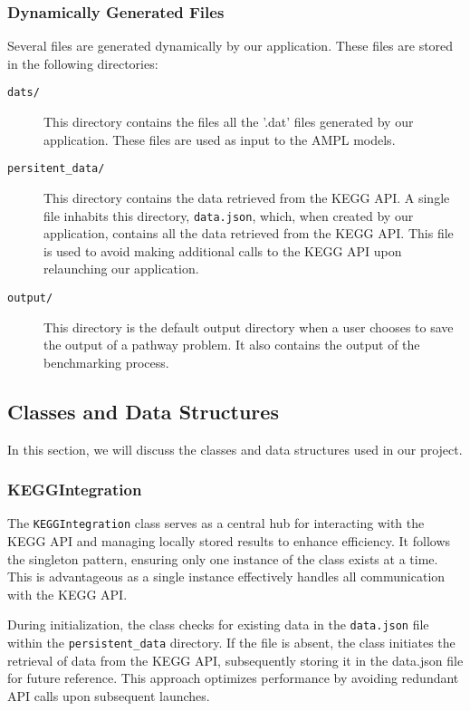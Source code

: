 \subsubsection{Dynamically Generated Files}

Several files are generated dynamically by our application. These files are stored in the following directories:

\begin{description}
    \item[\texttt{dats/}] This directory contains the files all the '.dat' files generated by our application. These files are used as input to the AMPL models.
    \item[\texttt{persitent\_data/}] This directory contains the data retrieved from the KEGG API. A single file inhabits this directory, \texttt{data.json}, which, when created by our application, contains all the data retrieved from the KEGG API. This file is used to avoid making additional calls to the KEGG API upon relaunching our application.
    \item[\texttt{output/}] This directory is the default output directory when a user chooses to save the output of a pathway problem. It also contains the output of the benchmarking process.
\end{description}

\subsection{Classes and Data Structures} \label{sec:classes_data_structures}

In this section, we will discuss the classes and data structures used in our project.

\subsubsection{KEGGIntegration}

The \texttt{KEGGIntegration} class serves as a central hub for interacting with the KEGG API and managing locally stored results to enhance efficiency. It follows the singleton pattern, ensuring only one instance of the class exists at a time. This is advantageous as a single instance effectively handles all communication with the KEGG API.

During initialization, the class checks for existing data in the \texttt{data.json} file within the \texttt{persistent\_data} directory. If the file is absent, the class initiates the retrieval of data from the KEGG API, subsequently storing it in the data.json file for future reference. This approach optimizes performance by avoiding redundant API calls upon subsequent launches.

